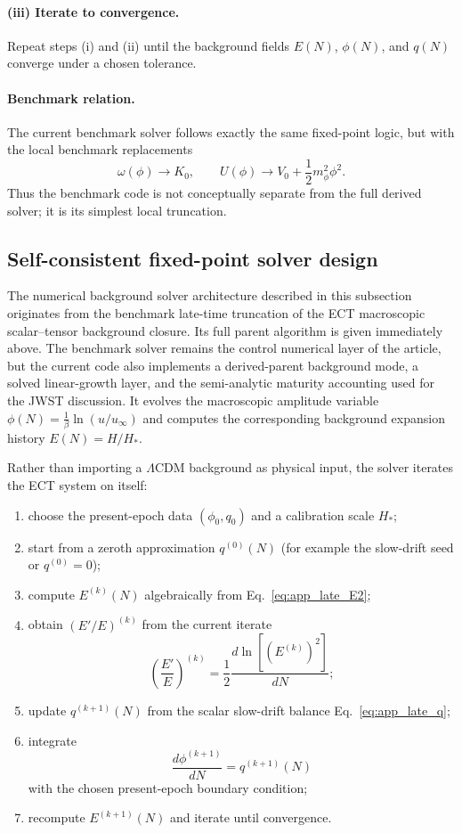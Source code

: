 \documentclass[11pt,a4paper]{article}
\numberwithin{equation}{section}
\begin{document}
\paragraph{(iii) Iterate to convergence.}
Repeat steps (i) and (ii) until the background fields
$E(N)$, $\phi(N)$, and $q(N)$ converge under a chosen tolerance.

\paragraph{Benchmark relation.}
The current benchmark solver follows exactly the same fixed-point logic,
but with the local benchmark replacements
\[
\omega(\phi)\to K_0,
\qquad
U(\phi)\to V_0+\frac12 m_\phi^2\phi^2.
\]
Thus the benchmark code is not conceptually separate from the full
derived solver; it is its simplest local truncation.

\subsection{Self-consistent fixed-point solver design}

The numerical background solver architecture described in this subsection
originates from the benchmark late-time truncation of the ECT
macroscopic scalar--tensor background closure.
Its full parent algorithm is given immediately above.
The benchmark solver remains the control numerical layer of the article,
but the current code also implements a derived-parent background mode,
a solved linear-growth layer, and the semi-analytic maturity accounting
used for the JWST discussion.
It evolves the macroscopic amplitude variable $\phi(N)=\frac{1}{\beta}\ln(u/u_\infty)$
and computes the corresponding background expansion history $E(N)=H/H_*$.

Rather than importing a $\Lambda$CDM background as physical input, the
solver iterates the ECT system on itself:

\begin{enumerate}
  \item choose the present-epoch data $(\phi_0,q_0)$ and a calibration
  scale $H_*$;
  \item start from a zeroth approximation $q^{(0)}(N)$ (for example the
  slow-drift seed or $q^{(0)}=0$);
  \item compute $E^{(k)}(N)$ algebraically from
  Eq.~\eqref{eq:app_late_E2};
  \item obtain $(E'/E)^{(k)}$ from the current iterate
  \[
    \left(\frac{E'}{E}\right)^{(k)}
    = \frac{1}{2}\frac{d\ln[(E^{(k)})^2]}{dN};
  \]
  \item update $q^{(k+1)}(N)$ from the scalar slow-drift balance
  Eq.~\eqref{eq:app_late_q};
  \item integrate
  \[
    \frac{d\phi^{(k+1)}}{dN}=q^{(k+1)}(N)
  \]
  with the chosen present-epoch boundary condition;
  \item recompute $E^{(k+1)}(N)$ and iterate until convergence.
\end{enumerate}
\end{document}
